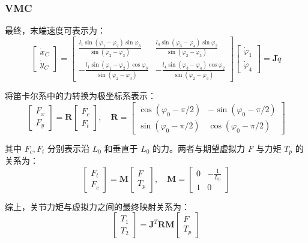 \documentclass{beamer}
\begin{document}
	
	\begin{frame}
		\frametitle{VMC}
		最终，末端速度可表示为：
		\begin{equation*}
			\begin{bmatrix} \dot{x}_C \\ \dot{y}_C \end{bmatrix} =
			\begin{bmatrix}
				\frac{l_1 \sin(\varphi_1 - \varphi_2) \sin\varphi_3}{\sin(\varphi_2 - \varphi_3)} & \frac{l_4 \sin(\varphi_3 - \varphi_4) \sin\varphi_2}{\sin(\varphi_2 - \varphi_3)} \\
				-\frac{l_1 \sin(\varphi_1 - \varphi_2) \cos\varphi_3}{\sin(\varphi_2 - \varphi_3)} & -\frac{l_4 \sin(\varphi_3 - \varphi_4) \cos\varphi_2}{\sin(\varphi_2 - \varphi_3)}
			\end{bmatrix}
			\begin{bmatrix} \dot{\varphi}_1 \\ \dot{\varphi}_4 \end{bmatrix} = \mathbf{J} \dot{q}
		\end{equation*}
		
		将笛卡尔系中的力转换为极坐标系表示：
		\begin{equation*}
			\begin{bmatrix} F_x \\ F_y \end{bmatrix} = \mathbf{R} \begin{bmatrix} F_c \\ F_t \end{bmatrix}, \quad \mathbf{R} = \begin{bmatrix} \cos(\varphi_0 - \pi/2) & -\sin(\varphi_0 - \pi/2) \\ \sin(\varphi_0 - \pi/2) & \cos(\varphi_0 - \pi/2) \end{bmatrix}
		\end{equation*}
		
		其中 $F_c, F_t$ 分别表示沿 $L_0$ 和垂直于 $L_0$ 的力。两者与期望虚拟力 $F$ 与力矩 $T_p$ 的关系为：
		\begin{equation*}
			\begin{bmatrix} F_t \\ F_c \end{bmatrix} = \mathbf{M} \begin{bmatrix} F \\ T_p \end{bmatrix}, \quad \mathbf{M} = \begin{bmatrix} 0 & -\frac{1}{L_0} \\ 1 & 0 \end{bmatrix}
		\end{equation*}
		
		综上，关节力矩与虚拟力之间的最终映射关系为：
		\begin{equation*}
			\begin{bmatrix} T_1 \\ T_2 \end{bmatrix} = \mathbf{J}^T \mathbf{R} \mathbf{M} \begin{bmatrix} F \\ T_p \end{bmatrix}
		\end{equation*}
	\end{frame}
	
\end{document}
